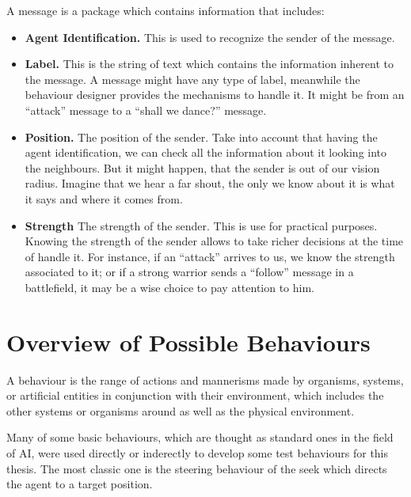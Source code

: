 A message is a package which contains information that includes:

\begin{itemize}

\item{{\bf Agent Identification.} This is used to recognize the sender of the message.}

\item{{\bf Label.} This is the string of text which contains the information inherent to the message. A message might have any type of label, meanwhile the behaviour designer provides the mechanisms to handle it. It might be from an ``attack'' message to a ``shall we dance?'' message.}

\item{{\bf Position.} The position of the sender. Take into account that having the agent identification, we can check all the information about it looking into the neighbours. But it might happen, that the sender is out of our vision radius. Imagine that we hear a far shout, the only we know about it is what it says and where it comes from.}

\item{{\bf Strength} The strength of the sender. This is use for practical purposes. Knowing the strength of the sender allows to take richer decisions at the time of handle it. For instance, if an ``attack'' arrives to us, we know the strength associated to it; or if a strong warrior sends a ``follow'' message in a battlefield, it may be a wise choice to pay attention to him.}

\end{itemize}

\section{Overview of Possible Behaviours}

A behaviour is the range of actions and mannerisms made by organisms, systems, or artificial entities in conjunction with their environment, which includes the other systems or organisms around as well as the physical environment.

Many of some basic behaviours, which are thought as standard ones in the field of AI, were used directly or inderectly to develop some test behaviours for this thesis. The most classic one is the steering behaviour of the seek which directs the agent to a target position.

